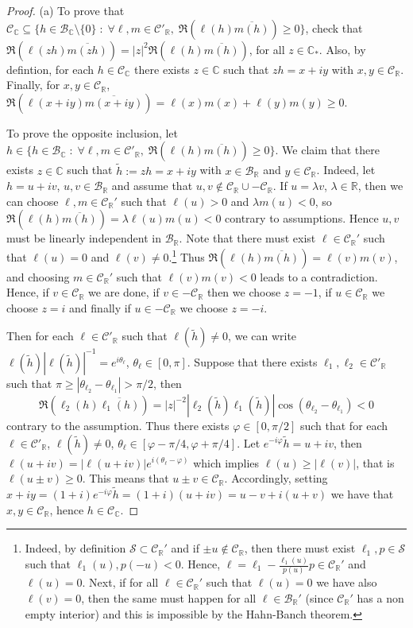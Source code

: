 \documentclass{amsart}
\numberwithin{equation}{section}
\newcommand\cB{{\mathcal B}}
\newcommand\cC{{\mathcal C}}
\newcommand\cS{{\mathcal S}}
\newcommand\bC{{\mathbb C}}
\newcommand\bR{{\mathbb R}}
\newcommand\vf{\varphi}
\begin{document}
\begin{proof}
(a) To prove that $\cC_\bC\subseteq\{h\in\cB_\bC\setminus\{0\}\;:\; \forall \ell, m\in \cC'_\bR,\; \Re\left(\ell(h)\overline{m(h)}\right)\geq 0\}$,  check that $\Re\left(\ell(z h)\overline{m(zh)}\right)=|z|^2\Re\left(\ell(h)\overline{m(h)}\right)$, for all $z\in\bC_*$. Also, by defintion, for each $h\in\cC_\bC$ there exists $z\in\bC$ such that $zh=x+iy$ with $x,y\in\cC_\bR$. Finally, for $x,y\in\cC_\bR$,  $\Re\left(\ell(x+iy)\overline{m(x+iy)}\right)=\ell(x)m(x)+\ell(y)m(y)\geq 0$.

To prove the opposite inclusion, let $h\in \{h\in\cB_\bC\;:\; \forall \ell, m\in \cC'_\bR,\; \Re\left(\ell(h)\overline{m(h)}\right)\geq 0\}$. We claim that there exists $z\in\bC$ such that $\tilde h:=zh=x+iy$ with $x\in\cB_\bR$ and $y\in\cC_\bR$. Indeed, let $h=u+iv$, $u,v\in\cB_\bR$ and assume that $u,v\not\in\cC_\bR\cup-\cC_\bR$. If $u=\lambda v$, $\lambda\in\bR$, then we can choose $\ell, m\in\cC_\bR'$ such that $\ell(u)>0$ and $\lambda m(u)<0$, so  $\Re\left(\ell(h)\overline{m(h)}\right)= \lambda \ell(u)m(u)<0$ contrary to assumptions. Hence $u,v$ must be linearly independent in $\cB_\bR$. Note that there must exist $\ell \in\cC_\bR'$ such that 
$\ell(u)=0$ and $\ell(v)\neq 0$.\footnote{ Indeed, by definition $\cS\subset \cC_\bR'$ and if $\pm u\not\in\cC_\bR$, then there must exist $\ell_1, p\in\cS$ such that $\ell_1(u), p(-u)<0$. Hence, $\ell=\ell_1-\frac{\ell_1(u)}{p(u)}p\in\cC_{\bR}'$ and $\ell(u)=0$. Next, if for all $\ell\in\cC_\bR'$ such that $\ell(u)=0$ we have also $\ell(v)=0$, then the same must happen for all $\ell\in\cB_\bR'$ (since $\cC_\bR'$ has a non empty interior) and this is impossible by the Hahn-Banch theorem.} Thus $\Re\left(\ell(h)\overline{m(h)}\right)=\ell(v)m(v)$, and choosing $m\in\cC_\bR'$ such that $\ell(v)m(v)<0$ leads to a contradiction. Hence, if $v\in\cC_\bR$ we are done, if $v\in -\cC_\bR$ then we choose $z=-1$, if $u\in\cC_\bR$ we choose $z=i$ and finally if $u\in-\cC_\bR$ we choose $z=-i$.

Then for each $\ell\in \cC'_\bR$ such that $\ell(\tilde h)\neq 0$, we can write  $\ell(\tilde h)|\ell(\tilde h)|^{-1}=e^{i\theta_\ell}$, $\theta_\ell\in [0,\pi]$. Suppose that there exists $\ell_1,\ell_2\in \cC'_\bR$ such that $\pi\geq |\theta_{\ell_2}-\theta_{\ell_1}|> \pi/2$, then 
\[
\Re(\ell_2 (h)\overline{\ell_1(h)})= |z|^{-2} |\ell_2(\tilde h)\ell_1(\tilde h)|\cos(\theta_{\ell_2}-\theta_{\ell_1})<0
\]
contrary to the assumption. Thus there exists $\vf\in [0,\pi/2]$ such that for each $\ell\in \cC'_\bR$, $\ell(\tilde h)\neq 0$, $\theta_\ell\in [\vf-\pi/4,\vf+\pi/4]$. Let $e^{-i\vf}\tilde h=u+iv$, then $\ell(u+iv)=|\ell(u+iv)|e^{i(\theta_\ell-\vf)}$ which implies $\ell(u)\geq |\ell(v)|$, that is $\ell(u\pm v)\geq 0$. This means that $u\pm v\in\cC_\bR$. Accordingly, setting 
$x+iy=(1+i)e^{-i\vf} \tilde h = (1+i)(u+iv)=u-v+i(u+v)$ we have that $x,y\in\cC_{\bR}$, hence $h\in\cC_\bC$.


\end{proof}
\end{document}
